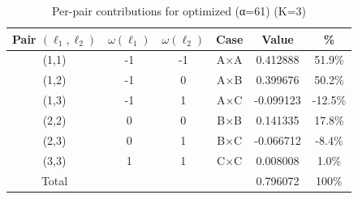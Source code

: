 \begin{table}[h]
\centering
\caption{Per-pair contributions for optimized (α=61) (K=3)}
\begin{tabular}{cccccc}
\hline
Pair $(\ell_1,\ell_2)$ & $\omega(\ell_1)$ & $\omega(\ell_2)$ & Case & Value & \% \\
\hline
(1,1) & -1 & -1 & A×A & 0.412888 & 51.9\% \\
(1,2) & -1 & 0 & A×B & 0.399676 & 50.2\% \\
(1,3) & -1 & 1 & A×C & -0.099123 & -12.5\% \\
(2,2) & 0 & 0 & B×B & 0.141335 & 17.8\% \\
(2,3) & 0 & 1 & B×C & -0.066712 & -8.4\% \\
(3,3) & 1 & 1 & C×C & 0.008008 & 1.0\% \\
\hline
Total & & & & 0.796072 & 100\% \\
\hline
\end{tabular}
\end{table}